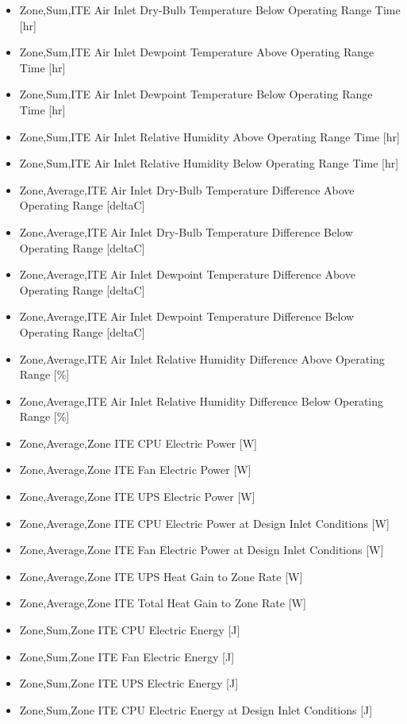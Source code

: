 \begin{itemize}
\item
  Zone,Sum,ITE Air Inlet Dry-Bulb Temperature Below Operating Range Time {[}hr{]}
\item
  Zone,Sum,ITE Air Inlet Dewpoint Temperature Above Operating Range Time {[}hr{]}
\item
  Zone,Sum,ITE Air Inlet Dewpoint Temperature Below Operating Range Time {[}hr{]}
\item
  Zone,Sum,ITE Air Inlet Relative Humidity Above Operating Range Time {[}hr{]}
\item
  Zone,Sum,ITE Air Inlet Relative Humidity Below Operating Range Time {[}hr{]}
\item
  Zone,Average,ITE Air Inlet Dry-Bulb Temperature Difference Above Operating Range {[}deltaC{]}
\item
  Zone,Average,ITE Air Inlet Dry-Bulb Temperature Difference Below Operating Range {[}deltaC{]}
\item
  Zone,Average,ITE Air Inlet Dewpoint Temperature Difference Above Operating Range {[}deltaC{]}
\item
  Zone,Average,ITE Air Inlet Dewpoint Temperature Difference Below Operating Range {[}deltaC{]}
\item
  Zone,Average,ITE Air Inlet Relative Humidity Difference Above Operating Range {[}\%{]}
\item
  Zone,Average,ITE Air Inlet Relative Humidity Difference Below Operating Range {[}\%{]}
\item
  Zone,Average,Zone ITE CPU Electric Power {[}W{]}
\item
  Zone,Average,Zone ITE Fan Electric Power {[}W{]}
\item
  Zone,Average,Zone ITE UPS Electric Power {[}W{]}
\item
  Zone,Average,Zone ITE CPU Electric Power at Design Inlet Conditions {[}W{]}
\item
  Zone,Average,Zone ITE Fan Electric Power at Design Inlet Conditions {[}W{]}
\item
  Zone,Average,Zone ITE UPS Heat Gain to Zone Rate {[}W{]}
\item
  Zone,Average,Zone ITE Total Heat Gain to Zone Rate {[}W{]}
\item
  Zone,Sum,Zone ITE CPU Electric Energy {[}J{]}
\item
  Zone,Sum,Zone ITE Fan Electric Energy {[}J{]}
\item
  Zone,Sum,Zone ITE UPS Electric Energy {[}J{]}
\item
  Zone,Sum,Zone ITE CPU Electric Energy at Design Inlet Conditions {[}J{]}

\end{itemize}
